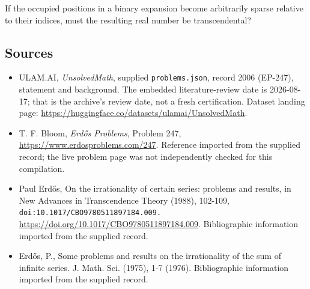 \documentclass[11pt,a4paper]{article}
\begin{document}
If the occupied positions in a binary expansion become arbitrarily sparse relative to their indices, must the resulting real number be transcendental?

\subsection{Sources}

{\small

\begin{itemize}

\item[\hypertarget{source:2006:1}{S1}] ULAM.AI, \emph{UnsolvedMath}, supplied \texttt{problems.json}, record 2006 (EP-247), statement and background. The embedded literature-review date is 2026-08-17; that is the archive’s review date, not a fresh certification. Dataset landing page: \url{https://huggingface.co/datasets/ulamai/UnsolvedMath}.

\item[\hypertarget{source:2006:2}{S2}] T. F. Bloom, \emph{Erdős Problems}, Problem 247, \url{https://www.erdosproblems.com/247}. Reference imported from the supplied record; the live problem page was not independently checked for this compilation.

\item[\hypertarget{source:2006:3}{S3}] Paul Erdős, On the irrationality of certain series: problems and results, in New Advances in Transcendence Theory (1988), 102-109, \nolinkurl{doi:10.1017/CBO9780511897184.009.} \url{https://doi.org/10.1017/CBO9780511897184.009}. Bibliographic information imported from the supplied record.

\item[\hypertarget{source:2006:4}{S4}] Erd\H{o}s, P., Some problems and results on the irrationality of the sum of infinite series. J. Math. Sci. (1975), 1-7 (1976). Bibliographic information imported from the supplied record.

\end{itemize}

}

\label{end:2006}
\end{document}
